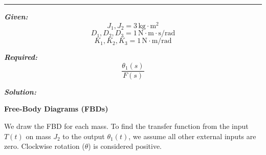 \documentclass[11pt]{article}
\begin{document}
\noindent\rule{\textwidth}{1pt}

\vspace{12pt}


\noindent\textbf{\textit{Given:}}
\[
J_1,J_2 = 3\, \text{kg}\cdot\text{m}^2
\]
\[
D_1,D_2,D_3 = 1\, \text{N}\cdot\text{m}\cdot\text{s/rad} 
\]
\[
K_1,K_2,K_3 = 1\, \text{N}\cdot\text{m/rad} 
\]

\vspace{1em}
\noindent

\noindent\textbf{\textit{Required:}}
\[
\frac{\theta_1(s)}{F(s)}
\]

\vspace{1.5em}
\noindent\textbf{\textit{Solution:}}

\vspace{8pt}

\noindent\textbf{Free-Body Diagrams (FBDs)}

\vspace{8pt}
\noindent We draw the FBD for each mass. To find the transfer function from the input $T(t)$ on mass $J_2$ to the output $\theta_1(t)$, we assume all other external inputs are zero. Clockwise rotation ($\theta$) is considered positive.
\end{document}
